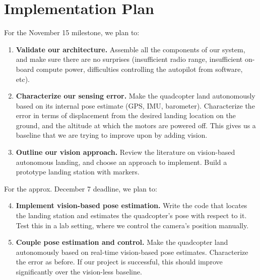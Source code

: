 \section*{Implementation Plan}

For the November 15 milestone, we plan to:

\begin{enumerate}

\item {\bf Validate our architecture.} Assemble all the components of our
system, and make sure there are no surprises (insufficient radio range,
insufficient on-board compute power, difficulties controlling the autopilot
from software, etc).

\item {\bf Characterize our sensing error.} Make the quadcopter land
autonomously based on its internal pose estimate (GPS, IMU, barometer).
Characterize the error in terms of displacement from the desired landing
location on the ground, and the altitude at which the motors are powered off.
This gives us a baseline that we are trying to improve upon by adding vision.

\item {\bf Outline our vision approach.} Review the literature on vision-based
autonomous landing, and choose an approach to implement. Build a prototype
landing station with markers.

\end{enumerate}

\noindent
For the approx. December 7 deadline, we plan to:

\begin{enumerate}
\setcounter{enumi}{3}

\item {\bf Implement vision-based pose estimation.} Write the code that locates
the landing station and estimates the quadcopter's pose with respect to it.
Test this in a lab setting, where we control the camera's position manually.

\item {\bf Couple pose estimation and control.} Make the quadcopter land
autonomously based on real-time vision-based pose estimates. Characterize the
error as before. If our project is successful, this should improve
significantly over the vision-less baseline.

\end{enumerate}
